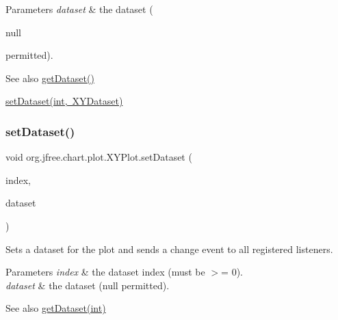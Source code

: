 \begin{DoxyParams}{Parameters}
{\em dataset} & the dataset (
\begin{DoxyCode}
null 
\end{DoxyCode}
 permitted).\\
\hline
\end{DoxyParams}
\begin{DoxySeeAlso}{See also}
\mbox{\hyperlink{classorg_1_1jfree_1_1chart_1_1plot_1_1_x_y_plot_a109d6defa2ec268944bd4d15ed6129cc}{get\+Dataset()}} 

\mbox{\hyperlink{classorg_1_1jfree_1_1chart_1_1plot_1_1_x_y_plot_a7a36700f3f8bf8484c75f2f195e0daf2}{set\+Dataset(int, X\+Y\+Dataset)}} 
\end{DoxySeeAlso}
\mbox{\label{classorg_1_1jfree_1_1chart_1_1plot_1_1_x_y_plot_a7a36700f3f8bf8484c75f2f195e0daf2}} 
\subsubsection{\texorpdfstring{set\+Dataset()}{setDataset()}\hspace{0.1cm}{\footnotesize\ttfamily [2/2]}}
{\footnotesize\ttfamily void org.\+jfree.\+chart.\+plot.\+X\+Y\+Plot.\+set\+Dataset (\begin{DoxyParamCaption}\item[{int}]{index,  }\item[{\mbox{\hyperlink{interfaceorg_1_1jfree_1_1data_1_1xy_1_1_x_y_dataset}{X\+Y\+Dataset}}}]{dataset }\end{DoxyParamCaption})}

Sets a dataset for the plot and sends a change event to all registered listeners.


\begin{DoxyParams}{Parameters}
{\em index} & the dataset index (must be $>$= 0). \\
\hline
{\em dataset} & the dataset ({\ttfamily null} permitted).\\
\hline
\end{DoxyParams}
\begin{DoxySeeAlso}{See also}
\mbox{\hyperlink{classorg_1_1jfree_1_1chart_1_1plot_1_1_x_y_plot_ace9e15aa124f2cb7565d8a133c25ea77}{get\+Dataset(int)}} 
\end{DoxySeeAlso}
\mbox{\label{classorg_1_1jfree_1_1chart_1_1plot_1_1_x_y_plot_ae1789cf50a68e21074c57a0bdc79c6c6}} 
